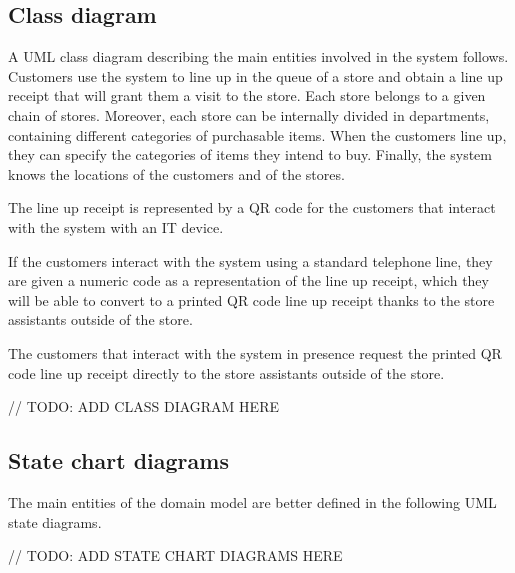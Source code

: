 \documentclass[../../main.tex]{subfiles}
\begin{document}
\subsection{Class diagram}

A UML class diagram describing the main entities involved in the system follows.
Customers use the system to line up in the queue of a store and obtain a line up
receipt that will grant them a visit to the store. Each store belongs to a given
chain of stores. Moreover, each store can be internally divided in departments,
containing different categories of purchasable items. When the customers line
up, they can specify the categories of items they intend to buy. Finally, the
system knows the locations of the customers and of the stores.

The line up receipt is represented by a QR code for the customers that interact with the system with an IT device.

If the customers interact with the system using a standard telephone line, they are given a numeric code as a representation of the line up receipt, which they will be able to convert to a printed QR code line up receipt thanks to the store assistants outside of the store.

The customers that interact with the system in presence request the printed QR code line up receipt directly to the store assistants outside of the store.

// TODO: ADD CLASS DIAGRAM HERE

\subsection{State chart diagrams}

The main entities of the domain model are better defined in the following UML
state diagrams.

// TODO: ADD STATE CHART DIAGRAMS HERE
\end{document}
